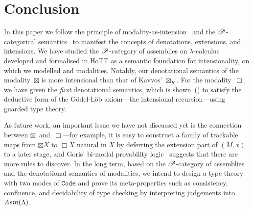 \documentclass[a4paper,UKenglish,numberwithinsect,cleveref,thm-restate,draft]{lipics-v2021}
\numberwithin{equation}{section}
\theoremstyle{definition}
\theoremstyle{plain}
\begin{document}
\nocite{Shamkanov2014, Shamkanov2016a}
\section{Conclusion}\label{sec:conclusion}
In this paper we follow the principle of modality-as-intension~\cite{Davies2001b} and the $\mathscr{P}$-categorical semantics~\cite{Kavvos2017b} to manifest the concepts of denotations, extensions, and intensions.
We have studied the $\mathscr{P}$-category of assemblies on $\lambda$-calculus developed and formalised in HoTT as a semantic foundation for intensionality, on which we modelled \SFour and \GL modalities.
Notably, our denotational semantics of the \SFour modality~$\boxtimes$ is more intensional than that of Kavvos' $\boxtimes_K$.
For the \GL modality~$\Box$, we have given the \emph{first} denotational semantics, which is shown~() to satisfy the deductive form of the Gödel-Löb axiom---the intensional recursion---using guarded type theory.

As future work, an important issue we have not discussed yet is the connection between $\boxtimes$~and~$\Box$---for example, it is easy to construct a family of trackable maps from $\boxtimes X$ to $\Box X$ natural in $X$ by deferring the extension part of $(M, x)$ to a later stage, and Goris' bi-modal provability logic~\cite{Goris2009} suggests that there are more rules to discover.
In the long term, based on the $\mathscr{P}$-category of assemblies and the denotational semantics of modalities, we intend to design a type theory with two modes of $\mathtt{Code}$ and prove its meta-properties such as consistency, confluence, and decidability of type checking by interpreting judgements into~$\Asm(\Lambda)$.

%
\end{document}

